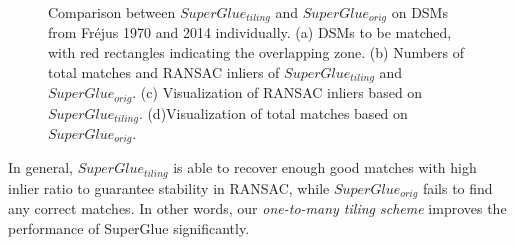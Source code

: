 \begin{figure}[htbp]
\begin{center}
{		}
		\caption{Comparison between $SuperGlue_{tiling}$ and $SuperGlue_{orig}$ on \ac{DSM}s from Fr{\'e}jus 1970 and 2014 individually. (a) \ac{DSM}s to be matched, with red rectangles indicating the overlapping zone. (b) Numbers of total matches and RANSAC inliers of $SuperGlue_{tiling}$ and $SuperGlue_{orig}$. (c) Visualization of RANSAC inliers based on $SuperGlue_{tiling}$. (d)Visualization of total matches based on $SuperGlue_{orig}$.}
		\label{MatchDSM}
	\end{center}
\end{figure} 

In general, $SuperGlue_{tiling}$ is able to recover enough good matches with high inlier ratio to guarantee stability in RANSAC, while $SuperGlue_{orig}$ fails to find any correct matches. In other words, our \textit{one-to-many tiling scheme} improves the performance of SuperGlue significantly.%

